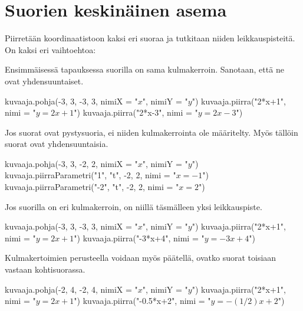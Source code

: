 \section{Suorien keskinäinen asema}


Piirretään koordinaatistoon kaksi eri suoraa ja tutkitaan niiden leikkauspisteitä.
On kaksi eri vaihtoehtoa:

Ensimmäisessä tapauksessa suorilla on sama kulmakerroin. Sanotaan, että ne ovat yhdensuuntaiset.

\begin{kuva}
    kuvaaja.pohja(-3, 3, -3, 3, nimiX = "$x$", nimiY = "$y$")
    kuvaaja.piirra("2*x+1", nimi = "$y=2x+1$")
    kuvaaja.piirra("2*x-3", nimi = "$y=2x-3$")
\end{kuva}

Jos suorat ovat pystysuoria, ei niiden kulmakerrointa ole määritelty. Myös tällöin suorat ovat yhdensuuntaisia.

\begin{kuva}
    kuvaaja.pohja(-3, 3, -2, 2, nimiX = "$x$", nimiY = "$y$")
    kuvaaja.piirraParametri("1", "t", -2, 2, nimi = "$x=-1$")
    kuvaaja.piirraParametri("-2", "t", -2, 2, nimi = "$x=2$")
\end{kuva}


Jos suorilla on eri kulmakerroin, on niillä täsmälleen yksi leikkauspiste. 

\begin{kuva}
    kuvaaja.pohja(-3, 3, -3, 3, nimiX = "$x$", nimiY = "$y$")
    kuvaaja.piirra("2*x+1", nimi = "$y=2x+1$")
    kuvaaja.piirra("-3*x+4", nimi = "$y=-3x+4$")
\end{kuva}

Kulmakertoimien perusteella voidaan myös päätellä, ovatko suorat toisiaan vastaan kohtisuorassa.

\begin{kuva}
    kuvaaja.pohja(-2, 4, -2, 4, nimiX = "$x$", nimiY = "$y$")
    kuvaaja.piirra("2*x+1", nimi = "$y=2x+1$")
    kuvaaja.piirra("-0.5*x+2", nimi = "$y=-(1/2)x+2$")
\end{kuva}

